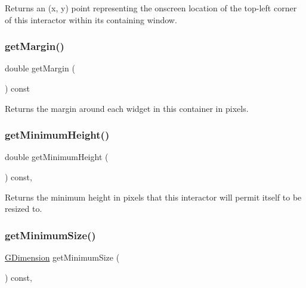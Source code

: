 Returns an (x, y) point representing the onscreen location of the top-\/left corner of this interactor within its containing window. 

\mbox{\label{classGContainer_ae2b63e249b9251e1893dae87aaf4cc3d}} 
\subsubsection{\texorpdfstring{get\+Margin()}{getMargin()}}
{\footnotesize\ttfamily double get\+Margin (\begin{DoxyParamCaption}{ }\end{DoxyParamCaption}) const\hspace{0.3cm}{\ttfamily [virtual]}}



Returns the margin around each widget in this container in pixels. 

\mbox{\label{classGInteractor_aed4b0075fcc434499c3cb3e46896bda3}} 
\subsubsection{\texorpdfstring{get\+Minimum\+Height()}{getMinimumHeight()}}
{\footnotesize\ttfamily double get\+Minimum\+Height (\begin{DoxyParamCaption}{ }\end{DoxyParamCaption}) const\hspace{0.3cm}{\ttfamily [virtual]}, {\ttfamily [inherited]}}



Returns the minimum height in pixels that this interactor will permit itself to be resized to. 

\mbox{\label{classGInteractor_a66b5af0b32493b4d597ca0a3df2049ea}} 
\subsubsection{\texorpdfstring{get\+Minimum\+Size()}{getMinimumSize()}}
{\footnotesize\ttfamily \mbox{\hyperlink{structGDimension}{G\+Dimension}} get\+Minimum\+Size (\begin{DoxyParamCaption}{ }\end{DoxyParamCaption}) const\hspace{0.3cm}{\ttfamily [virtual]}, {\ttfamily [inherited]}}



